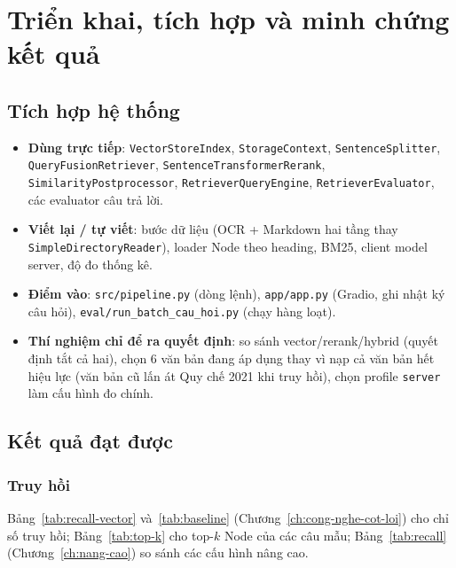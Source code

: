 \chapter{Triển khai, tích hợp và minh chứng kết quả}
\label{ch:trien-khai}

\section{Tích hợp hệ thống}

\begin{sloppypar}

\begin{itemize}
  \item \textbf{Dùng trực tiếp}: \texttt{VectorStoreIndex}, \texttt{StorageContext}, \texttt{SentenceSplitter},
        \texttt{QueryFusionRetriever}, \texttt{SentenceTransformerRerank}, \texttt{SimilarityPostprocessor},
        \texttt{RetrieverQueryEngine}, \texttt{RetrieverEvaluator}, các evaluator câu trả lời.
  \item \textbf{Viết lại / tự viết}: bước dữ liệu (OCR + Markdown hai tầng thay \texttt{SimpleDirectoryReader}),
        loader Node theo heading, BM25, client model server, độ đo thống kê.
  \item \textbf{Điểm vào}: \texttt{src/pipeline.py} (dòng lệnh), \texttt{app/app.py} (Gradio, ghi nhật ký câu hỏi),
        \texttt{eval/run\_batch\_cau\_hoi.py} (chạy hàng loạt).
  \item \textbf{Thí nghiệm chỉ để ra quyết định}: so sánh vector/rerank/hybrid (quyết định tắt cả hai), chọn
        6 văn bản đang áp dụng thay vì nạp cả văn bản hết hiệu lực (văn bản cũ lấn át Quy chế 2021 khi truy
        hồi), chọn profile \texttt{server} làm cấu hình đo chính.
\end{itemize}
\end{sloppypar}

\section{Kết quả đạt được}

\subsection{Truy hồi}

Bảng~\ref{tab:recall-vector} và~\ref{tab:baseline} (Chương~\ref{ch:cong-nghe-cot-loi}) cho chỉ số truy hồi;
Bảng~\ref{tab:top-k} cho top-$k$ Node của các câu mẫu; Bảng~\ref{tab:recall} (Chương~\ref{ch:nang-cao}) so
sánh các cấu hình nâng cao.

